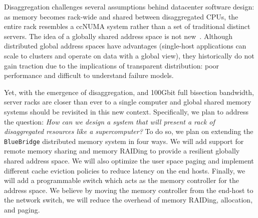Disaggregation challenges several assumptions behind datacenter software
design: as memory becomes rack-wide and shared between disaggregated CPUs, the
entire rack resembles a ccNUMA system rather than a set of traditional
distinct servers. 
The idea of a globally shared address space is not new~\cite{Nelson2015,Keleher1994}.
Although distributed global address spaces have advantages (single-host
applications can scale to clusters and operate on data with a global view),
they historically do not gain traction due to the implications of transparent
distribution: poor performance and difficult to understand failure models. 


Yet, with the emergence of disaggregation, and 100Gbit full bisection
bandwidth, server racks are closer than ever to a single computer and
global shared memory systems should be revisited in this new context.
Specifically, we plan to address the question: \emph{How can we design
a system that will present a rack of disaggregated resources like a
supercomputer?} To do so, we plan on extending the \texttt{BlueBridge}
distributed memory system in four ways. We will add support for remote
memory sharing and memory RAIDing to provide a resilient globally
shared address space. We will also optimize the user space paging and
implement different cache eviction policies to reduce latency on the
end hosts. Finally, we will add a programmable switch which acts as
the memory controller for the address space. We believe by moving the
memory controller from the end-host to the network switch, we will
reduce the overhead of memory RAIDing, allocation, and paging.


